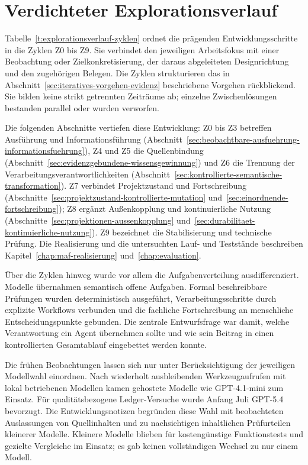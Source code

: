 \section{Verdichteter Explorationsverlauf}
\label{sec:explorationsverlauf}

Tabelle~\ref{t:explorationsverlauf-zyklen} ordnet die prägenden
Entwicklungsschritte in die Zyklen Z0 bis Z9. Sie verbindet den jeweiligen
Arbeitsfokus mit einer Beobachtung oder Zielkonkretisierung, der daraus
abgeleiteten Designrichtung und den zugehörigen Belegen. Die Zyklen
strukturieren das in Abschnitt~\ref{sec:iteratives-vorgehen-evidenz}
beschriebene Vorgehen rückblickend. Sie bilden keine strikt getrennten
Zeiträume ab; einzelne Zwischenlösungen bestanden parallel oder wurden
verworfen.

Die folgenden Abschnitte vertiefen diese Entwicklung: Z0 bis Z3 betreffen
Ausführung und Informationsführung
(Abschnitt~\ref{sec:beobachtbare-ausfuehrung-informationsfuehrung}),
Z4 und Z5 die Quellenbindung
(Abschnitt~\ref{sec:evidenzgebundene-wissensgewinnung}) und Z6 die
Trennung der Verarbeitungsverantwortlichkeiten
(Abschnitt~\ref{sec:kontrollierte-semantische-transformation}). Z7
verbindet Projektzustand und Fortschreibung
(Abschnitte~\ref{sec:projektzustand-kontrollierte-mutation}
und~\ref{sec:einordnende-fortschreibung}); Z8 ergänzt Außenkopplung
und kontinuierliche Nutzung
(Abschnitte~\ref{sec:projektionen-aussenkopplung}
und~\ref{sec:durabilitaet-kontinuierliche-nutzung}). Z9 bezeichnet die
Stabilisierung und technische Prüfung. Die Realisierung und die
untersuchten Lauf- und Teststände beschreiben
Kapitel~\ref{chap:maf-realisierung} und~\ref{chap:evaluation}.



Über die Zyklen hinweg wurde vor allem die Aufgabenverteilung
ausdifferenziert. Modelle übernahmen semantisch offene Aufgaben.
Formal beschreibbare Prüfungen wurden deterministisch ausgeführt,
Verarbeitungsschritte durch explizite Workflows verbunden und
die fachliche Fortschreibung an menschliche Entscheidungspunkte gebunden.
Die zentrale Entwurfsfrage war damit, welche Verantwortung ein Agent
übernehmen sollte und wie sein Beitrag in einen kontrollierten
Gesamtablauf eingebettet werden konnte.

Die frühen Beobachtungen lassen sich nur unter Berücksichtigung der
jeweiligen Modellwahl einordnen. Nach wiederholt ausbleibenden
Werkzeugaufrufen mit lokal betriebenen Modellen kamen gehostete
Modelle wie GPT-4.1-mini zum Einsatz. Für qualitätsbezogene
Ledger-Versuche wurde Anfang Juli GPT-5.4 bevorzugt. Die
Entwicklungsnotizen begründen diese Wahl mit beobachteten Auslassungen
von Quellinhalten und zu nachsichtigen inhaltlichen Prüfurteilen
kleinerer Modelle. Kleinere Modelle blieben für kostengünstige
Funktionstests und gezielte Vergleiche im Einsatz; es gab keinen
vollständigen Wechsel zu nur einem Modell.

